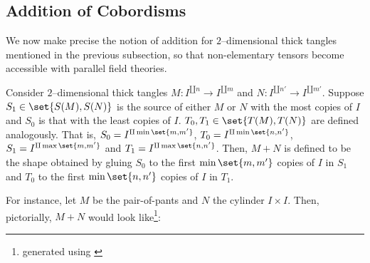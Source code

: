 
\subsection{Addition of Cobordisms}

We now make precise the notion of addition for $2$--dimensional thick tangles
mentioned in the previous subsection, so that non-elementary tensors become
accessible with parallel field theories.

Consider $2$--dimensional thick tangles $M : I^{\amalg n} \to I^{\amalg m}$ and
$N : I^{\amalg n'} \to I^{\amalg m'}$. Suppose $S_1 \in \set{S(M), S(N)}$ is the
source of either $M$ or $N$ with the most copies of $I$ and $S_0$ is that with
the least copies of $I$. $T_0, T_1 \in \set{T(M), T(N)}$ are defined
analogously. That is, $S_0 = I^{\amalg \min\set{m, m'}}$,
$T_0 = I^{\amalg \min\set{n, n'}}$, $S_1 = I^{\amalg \max\set{m, m'}}$ and
$T_1 = I^{\amalg \max\set{n, n'}}$. Then, $M + N$ is defined to be the shape
obtained by gluing $S_0$ to the first $\min\set{m, m'}$ copies of $I$ in
$S_1$ and $T_0$ to the first $\min\set{n, n'}$ copies of $I$ in $T_1$.

For instance, let $M$ be the pair-of-pants and $N$ the cylinder $I \times I$.
Then, pictorially, $M + N$ would look like\footnote{generated using
\cite{Mathcha}}:

